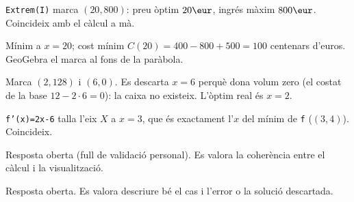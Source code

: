 \begin{solucions}
\begin{sollist}
  \item \texttt{Extrem(I)} marca $(20,800)$: preu òptim $20\eur$, ingrés màxim $800\eur$.
        Coincideix amb el càlcul a mà.
  \item Mínim a $x=20$; cost mínim $C(20)=400-800+500=100$ centenars d'euros. GeoGebra el
        marca al fons de la paràbola.
  \item Marca $(2,128)$ i $(6,0)$. Es descarta $x=6$ perquè dona volum zero (el costat de
        la base $12-2\cdot 6=0$): la caixa no existeix. L'òptim real és $x=2$.
  \item \texttt{f'(x)=2x-6} talla l'eix $X$ a $x=3$, que és exactament l'$x$ del mínim de
        \texttt{f} ($(3,4)$). Coincideix.
  \item Resposta oberta (full de validació personal). Es valora la coherència entre el
        càlcul i la visualització.
  \item Resposta oberta. Es valora descriure bé el cas i l'error o la solució descartada.
\end{sollist}
\end{solucions}
